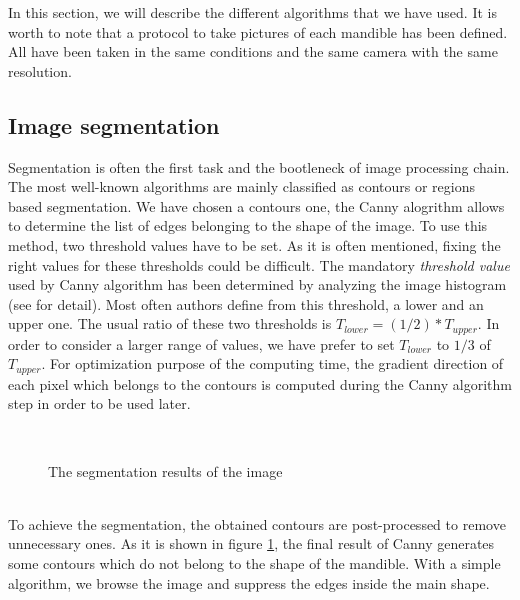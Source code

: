 \documentclass[twoside,twocolumn,10pt]{article}
\begin{document}
In this section, we will describe the different algorithms that we have
used. It is worth to note that a protocol to take pictures of each mandible has
been defined. All have been taken in the same conditions and the same
camera with the same resolution.
\subsection{Image segmentation}
Segmentation is often the first task and the bootleneck of image processing
chain. The most well-known algorithms are mainly classified as contours
or regions based segmentation. We have chosen a contours one, the
Canny alogrithm\cite{canny1986computational} allows to determine the 
list of edges belonging to the shape of the image.
To use this method, two threshold values have to be set. As it is often mentioned, fixing the right values for these thresholds could be difficult\cite{adaptiveCanny}. The mandatory \textit{threshold
  value} used by Canny algorithm has been determined by analyzing the image
histogram (see \cite{leestimating} for detail). Most often authors define from this threshold, a lower and an upper one. The usual ratio of these two thresholds is $T_{lower} = (1/2) * T_{upper}$. In order to consider a larger range of values, we have prefer to set $T_{lower}$ to $1/3$ of $T_{upper}$. For optimization purpose of the computing time, the gradient direction of each pixel which belongs to the contours is computed during the Canny algorithm step in order to be used later.\\
\begin{figure}[h]
\centering
{}~~ 
\caption{The segmentation results of the image}
\label{canny}
\end{figure}~\\
To achieve the segmentation, the obtained contours are post-processed to remove unnecessary
ones. As it is shown in figure \ref{canny}, the final result of Canny generates some contours which do not belong to the shape of the mandible. With a simple algorithm, we browse the image and suppress the edges inside the main shape.
\end{document}
